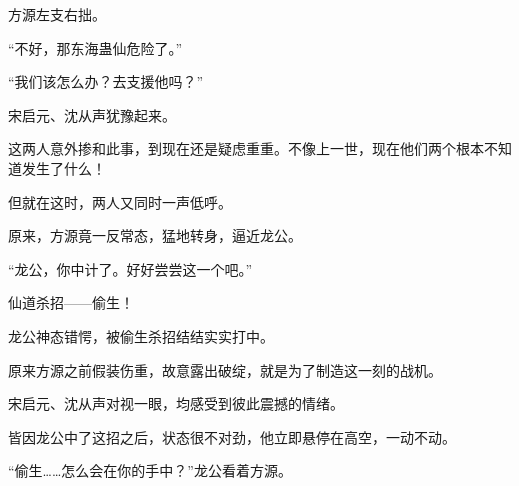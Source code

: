 \begin{this_body}
方源左支右拙。

“不好，那东海蛊仙危险了。”

“我们该怎么办？去支援他吗？”

宋启元、沈从声犹豫起来。

这两人意外掺和此事，到现在还是疑虑重重。不像上一世，现在他们两个根本不知道发生了什么！

但就在这时，两人又同时一声低呼。

原来，方源竟一反常态，猛地转身，逼近龙公。

“龙公，你中计了。好好尝尝这一个吧。”

仙道杀招——偷生！

龙公神态错愕，被偷生杀招结结实实打中。

原来方源之前假装伤重，故意露出破绽，就是为了制造这一刻的战机。

宋启元、沈从声对视一眼，均感受到彼此震撼的情绪。

皆因龙公中了这招之后，状态很不对劲，他立即悬停在高空，一动不动。

“偷生……怎么会在你的手中？”龙公看着方源。

\end{this_body}

